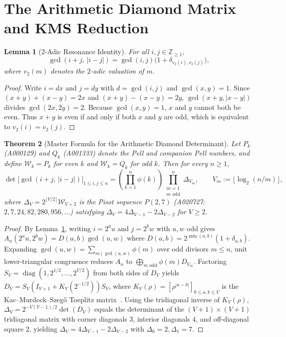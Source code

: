 \documentclass[12pt,reqno]{article}
\newtheorem{theorem}{Theorem}[section]
\newtheorem{lemma}[theorem]{Lemma}
\begin{document}
\section{The Arithmetic Diamond Matrix and KMS Reduction}

\begin{lemma}[2-Adic Resonance Identity]\label{lem:resonance}
For all $i,j \in \mathbb{Z}_{\ge 1}$,
\begin{equation}
\gcd(i+j, \, |i-j|) = \gcd(i,j)\big(1 + \delta_{v_2(i), v_2(j)}\big),
\end{equation}
where $v_2(m)$ denotes the $2$-adic valuation of $m$.
\end{lemma}
\begin{proof}
Write $i = dx$ and $j = dy$ with $d = \gcd(i,j)$ and $\gcd(x,y)=1$. Since $(x+y)+(x-y)=2x$ and $(x+y)-(x-y)=2y$, $\gcd(x+y,|x-y|)$ divides $\gcd(2x,2y)=2$. Because $\gcd(x,y)=1$, $x$ and $y$ cannot both be even. Thus $x+y$ is even if and only if both $x$ and $y$ are odd, which is equivalent to $v_2(i)=v_2(j)$.
\end{proof}

\begin{theorem}[Master Formula for the Arithmetic Diamond Determinant]\label{thm:diamond}
Let $P_k$ (A000129) and $Q_k$ (A001333) denote the Pell and companion Pell numbers, and define $\mathcal{W}_k = P_k$ for even $k$ and $\mathcal{W}_k = Q_k$ for odd $k$. Then for every $n \ge 1$,
\begin{equation}
\det\big[\gcd(i+j, \, |i-j|)\big]_{1\le i,j\le n} = \left(\prod_{k=1}^n \phi(k)\right) \prod_{\substack{m=1 \\ m\text{ odd}}}^{n} \Delta_{V_m}, \qquad V_m := \lfloor \log_2(n/m)\rfloor,
\end{equation}
where $\Delta_V = 2^{\lfloor V/2\rfloor}\mathcal{W}_{V+2}$ is the Pisot sequence $P(2,7)$ (A020727: $2, 7, 24, 82, 280, 956, \dots$) satisfying $\Delta_V = 4\Delta_{V-1} - 2\Delta_{V-2}$ for $V\ge 2$.
\end{theorem}
\begin{proof}
By Lemma~\ref{lem:resonance}, writing $i = 2^a u$ and $j = 2^b w$ with $u,w$ odd gives $A_n(2^a u, 2^b w) = D(a,b)\gcd(u,w)$ where $D(a,b) = 2^{\min(a,b)}(1+\delta_{a,b})$. Expanding $\gcd(u,w) = \sum_{m\mid \gcd(u,w)} \phi(m)$ over odd divisors $m \le n$, unit lower-triangular congruence reduces $A_n$ to $\bigoplus_{m\text{ odd}} \phi(m) D_{V_m}$. Factoring $S_V = \operatorname{diag}(1, 2^{1/2}, \dots, 2^{V/2})$ from both sides of $D_V$ yields $D_V = S_V(I_{V+1} + K_V(2^{-1/2}))S_V$, where $K_V(\rho) = [\rho^{|a-b|}]_{0\le a,b\le V}$ is the Kac--Murdock--Szeg\H{o} Toeplitz matrix~\cite{KMS1953}. Using the tridiagonal inverse of $K_V(\rho)$, $\Delta_V = 2^{-V(V-1)/2}\det(D_V)$ equals the determinant of the $(V+1)\times(V+1)$ tridiagonal matrix with corner diagonals $3$, interior diagonals $4$, and off-diagonal square $2$, yielding $\Delta_V = 4\Delta_{V-1}-2\Delta_{V-2}$ with $\Delta_0=2, \Delta_1=7$.
\end{proof}
\end{document}
